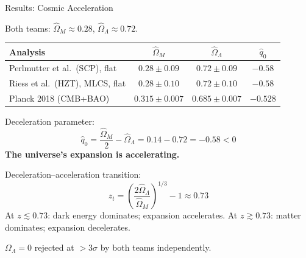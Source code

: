 \documentclass[aspectratio=169]{beamer}
\begin{document}
\begin{frame}[shrink=5]{Results: Cosmic Acceleration}

Both teams: $\hat\Omega_M \approx 0.28$, $\hat\Omega_\Lambda \approx 0.72$.

\medskip
\begin{center}
\begin{tabular}{p{4.2cm}ccc}
\toprule
Analysis & $\hat\Omega_M$ & $\hat\Omega_\Lambda$ & $\hat q_0$ \\
\midrule
Perlmutter et al.\ (SCP), flat & $0.28\pm0.09$ & $0.72\pm0.09$ & $-0.58$ \\
Riess et al.\ (HZT), MLCS, flat & $0.28\pm0.10$ & $0.72\pm0.10$ & $-0.58$ \\
\midrule
Planck 2018 (CMB+BAO) & $0.315\pm0.007$ & $0.685\pm0.007$ & $-0.528$ \\
\bottomrule
\end{tabular}
\end{center}

\medskip
Deceleration parameter:
\[
  \hat q_0 = \frac{\hat\Omega_M}{2} - \hat\Omega_\Lambda
           = 0.14 - 0.72 = \mathbf{-0.58} < 0
\]
\textbf{The universe's expansion is accelerating.}

\medskip
Deceleration--acceleration transition:
\[
  z_t = \left(\frac{2\hat\Omega_\Lambda}{\hat\Omega_M}\right)^{1/3} - 1
  \approx 0.73
\]
At $z \lesssim 0.73$: dark energy dominates; expansion accelerates.
At $z \gtrsim 0.73$: matter dominates; expansion decelerates.

\medskip
$\Omega_\Lambda = 0$ rejected at $> 3\sigma$ by both teams independently.

\end{frame}
\end{document}

